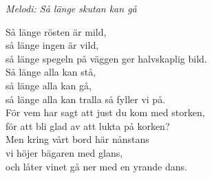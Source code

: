 {\footnotesize\textit{Melodi: Så länge skutan kan gå}}\par
\vspace{10pt}
Så länge rösten är mild,\\
så länge ingen är vild,\\
så länge spegeln på väggen ger halvskaplig bild.\\
Så länge alla kan stå,\\
så länge alla kan gå,\\
så länge alla kan tralla så fyller vi på.\\
För vem har sagt att just du kom med storken,\\
för att bli glad av att lukta på korken?\\
Men kring vårt bord här nånstans\\
vi höjer bägaren med glans,\\
och låter vinet gå ner med en yrande dans.
